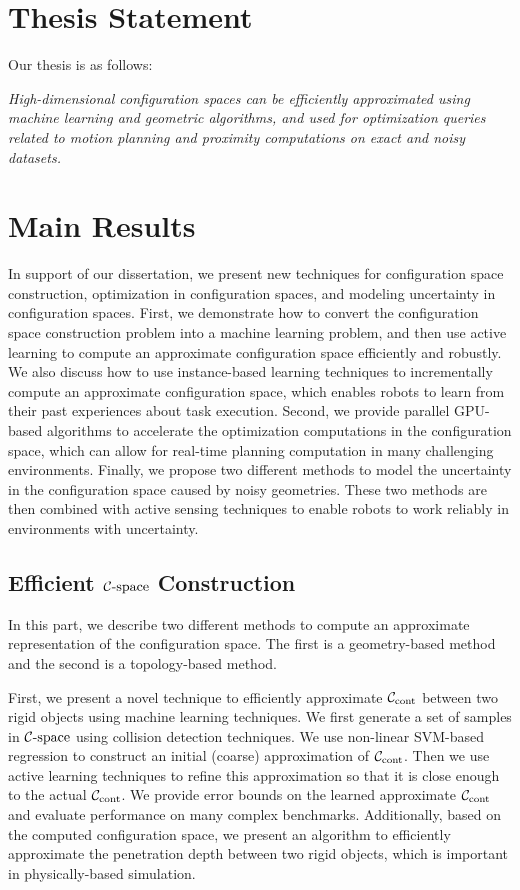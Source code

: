\section{Thesis Statement}

Our thesis is as follows:

\textit{High-dimensional configuration spaces can be efficiently approximated using machine learning and geometric algorithms, and used for optimization queries related to motion planning and proximity computations on exact and noisy datasets.}

\section{Main Results}
In support of our dissertation, we present new techniques for configuration space construction, optimization in configuration spaces, and modeling uncertainty in configuration spaces. First, we demonstrate how to convert the configuration space construction problem into a machine learning problem, and then use active learning to compute an approximate configuration space efficiently and robustly. We also discuss how to use instance-based learning techniques to incrementally compute an approximate configuration space, which enables robots to learn from their past experiences about task execution. Second, we provide parallel GPU-based algorithms to accelerate the optimization computations in the configuration space, which can allow for real-time planning computation in many challenging environments. Finally, we propose two different methods to model the uncertainty in the configuration space caused by noisy geometries. These two methods are then combined with active sensing techniques to enable robots to work reliably in environments with uncertainty.

\subsection{Efficient $\mathcal C\text{-space}$ Construction}
In this part, we describe two different methods to compute an approximate representation of the configuration space. The first is a geometry-based method and the second is a topology-based method.

First, we present a novel technique to efficiently approximate $\mathcal C_\text{cont}$ between two rigid objects using machine learning techniques. We first generate a set of samples in $\mathcal C\text{-space}$ using collision detection techniques. We use non-linear SVM-based regression to construct an initial (coarse) approximation of $\mathcal C_\text{cont}$. Then we use active learning techniques to refine this approximation so that it is close enough to the actual $\mathcal C_\text{cont}$. We provide error bounds on the learned approximate $\mathcal C_\text{cont}$ and evaluate performance on many complex benchmarks. Additionally, based on the computed configuration space, we present an algorithm to efficiently approximate the penetration depth between two rigid objects, which is important in physically-based simulation.

